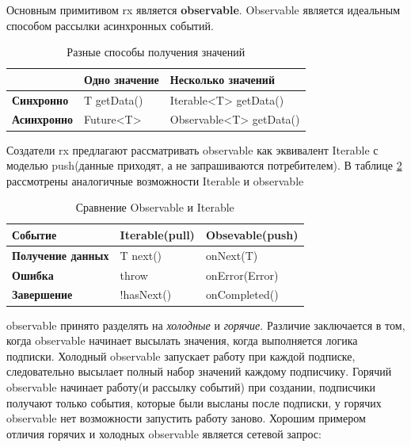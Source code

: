 Основным примитивом \gls{rx} является \textbf{\gls{observable}}. Observable является идеальным способом рассылки асинхронных событий.

\begin{table}[h!]
\caption{Разные способы получения значений}
\label{theory:archeticture:rx:call}
\centering
\begin{tabularx}{\textwidth}{ |X|X|X| } 
 \hline
  & \textbf{Одно значение} & \textbf{Несколько значений} \\ 
 \hline
 \textbf{Синхронно} & T getData() & Iterable<T> getData() \\ 
 \hline
 \textbf{Асинхронно} & Future<T> & Observable<T> getData() \\ 
 \hline
\end{tabularx}
\end{table}

Создатели \gls{rx} предлагают\cite{reactivex:introduction} рассматривать \gls{observable} как эквивалент Iterable с моделью push(данные приходят, а не запрашиваются потребителем). В таблице \ref{theory:archeticture:rx:iterable-observable} рассмотрены аналогичные возможности Iterable и \gls{observable}

\begin{table}[h!]
\caption{Сравнение Observable и Iterable}
\label{theory:archeticture:rx:iterable-observable}
\centering
\begin{tabularx}{\textwidth}{ |X|X|X| } 
 \hline
 \textbf{Событие} & \textbf{Iterable(pull)} & \textbf{Obsevable(push)} \\ 
 \hline
 \textbf{Получение данных} & T next() & onNext(T) \\ 
 \hline
 \textbf{Ошибка} & throw & onError(Error) \\ 
 \hline
  \textbf{Завершение} & !hasNext() & onCompleted() \\ 
 \hline
\end{tabularx}
\end{table}

\gls{observable} принято разделять на \textit{холодные} и \textit{горячие}. Различие заключается в том, когда \gls{observable} начинает высылать значения, когда выполняется логика подписки. Холодный \gls{observable} запускает работу при каждой подписке, следовательно высылает полный набор значений каждому подписчику. Горячий \gls{observable} начинает работу(и рассылку событий) при создании, подписчики получают только события, которые были высланы после подписки, у горячих \gls{observable} нет возможности запустить работу заново. Хорошим примером отличия горячих и холодных \gls{observable} является сетевой запрос:

